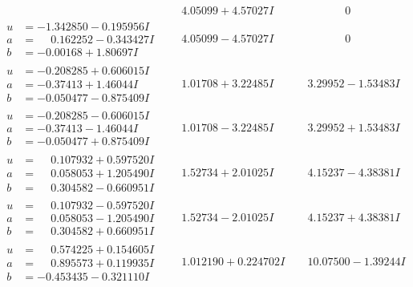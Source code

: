 \documentclass[1p]{elsarticle_modified}
\theoremstyle{definition}
\begin{document}
$$\begin{array}{c|c|c}
 & \phantom{-}4.05099 + 4.57027 I & \phantom{-0.000000 } 0 \\ \hline\begin{aligned}
u &= -1.342850 - 0.195956 I \\
a &= \phantom{-}0.162252 - 0.343427 I \\
b &= -0.00168 + 1.80697 I\end{aligned}
 & \phantom{-}4.05099 - 4.57027 I & \phantom{-0.000000 } 0 \\ \hline\begin{aligned}
u &= -0.208285 + 0.606015 I \\
a &= -0.37413 + 1.46044 I \\
b &= -0.050477 - 0.875409 I\end{aligned}
 & \phantom{-}1.01708 + 3.22485 I & \phantom{-}3.29952 - 1.53483 I \\ \hline\begin{aligned}
u &= -0.208285 - 0.606015 I \\
a &= -0.37413 - 1.46044 I \\
b &= -0.050477 + 0.875409 I\end{aligned}
 & \phantom{-}1.01708 - 3.22485 I & \phantom{-}3.29952 + 1.53483 I \\ \hline\begin{aligned}
u &= \phantom{-}0.107932 + 0.597520 I \\
a &= \phantom{-}0.058053 + 1.205490 I \\
b &= \phantom{-}0.304582 - 0.660951 I\end{aligned}
 & \phantom{-}1.52734 + 2.01025 I & \phantom{-}4.15237 - 4.38381 I \\ \hline\begin{aligned}
u &= \phantom{-}0.107932 - 0.597520 I \\
a &= \phantom{-}0.058053 - 1.205490 I \\
b &= \phantom{-}0.304582 + 0.660951 I\end{aligned}
 & \phantom{-}1.52734 - 2.01025 I & \phantom{-}4.15237 + 4.38381 I \\ \hline\begin{aligned}
u &= \phantom{-}0.574225 + 0.154605 I \\
a &= \phantom{-}0.895573 + 0.119935 I \\
b &= -0.453435 - 0.321110 I\end{aligned}
 & \phantom{-}1.012190 + 0.224702 I & \phantom{-}10.07500 - 1.39244 I \\ \hline\begin{aligned}

\end{aligned}
\end{array}$$
\end{document}
